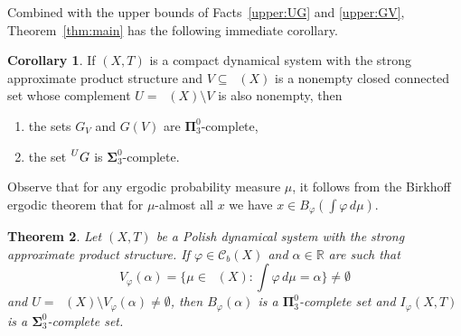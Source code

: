 \documentclass{amsart}
\newtheorem{thm}{Theorem}
\theoremstyle{definition}
\newtheorem{cor}[thm]{Corollary}
\newcommand{\bP}{\boldsymbol{\Pi}}
\newcommand{\bS}{\boldsymbol{\Sigma}}
\renewcommand{\phi}{\varphi}
\DeclareMathOperator{\MT}{\mathcal{M}_{\mathit T} }
\newcommand{\R}{\mathbb{R}}
\newcommand{\co}[1]{{\color{red}#1}}
\begin{document}
Combined with the upper bounds of Facts~\ref{upper:UG} and \ref{upper:GV},
Theorem~\ref{thm:main} has the following immediate corollary.




\begin{cor}
If $(X,T)$ is a compact dynamical system with the strong approximate product structure
and $V\subseteq \MT(X)$ is a nonempty closed connected set whose complement
$U=\MT(X)\setminus V$ is also nonempty, then
\begin{enumerate}
\item the sets $G_V$ and $G(V)$ are $\bP_3^0$-complete,
\item the set $\prescript{U}{}G$  is $\bS_3^0$-complete.
\end{enumerate}
\end{cor}

Observe that for any ergodic probability measure $\mu$, it follows from the
Birkhoff ergodic theorem that
for $\mu$-almost all $x$ we have $x\in B_\phi(\int\phi\,d\mu)$.


%
%
%
%
%
%
%



\begin{thm} \label{thm:phi_nocompact}
Let $(X,T)$ be a Polish dynamical  system with the strong approximate product structure.
If $\phi\in\mathcal{C}_b(X)$ and $\alpha\in\R$ are such that
\[
V_\phi(\alpha)=\{\mu\in\MT(X)\colon \int\phi\,d\mu=\alpha\}\neq\emptyset
\]
and $U=\MT(X)\setminus V_\phi(\alpha)\neq\emptyset$, then
$B_\phi(\alpha)$ is a $\bP^0_3$-complete set and $I_\phi(X,T)$ is a $\bS^0_3$-complete set.
\end{thm}
\end{document}

